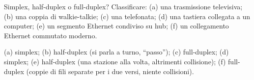 \begin{esercizio}{Simplex, half-duplex o full-duplex?}
Classificare: (a) una trasmissione televisiva; (b) una coppia di walkie-talkie; (c) una telefonata; (d) una tastiera
collegata a un computer; (e) un segmento Ethernet condiviso su hub; (f) un collegamento Ethernet commutato moderno.
\end{esercizio}

\svolgimento
(a) simplex; (b) half-duplex (si parla a turno, ``passo''); (c) full-duplex; (d) simplex; (e) half-duplex (una stazione
alla volta, altrimenti collisione); (f) full-duplex (coppie di fili separate per i due versi, niente collisioni).

